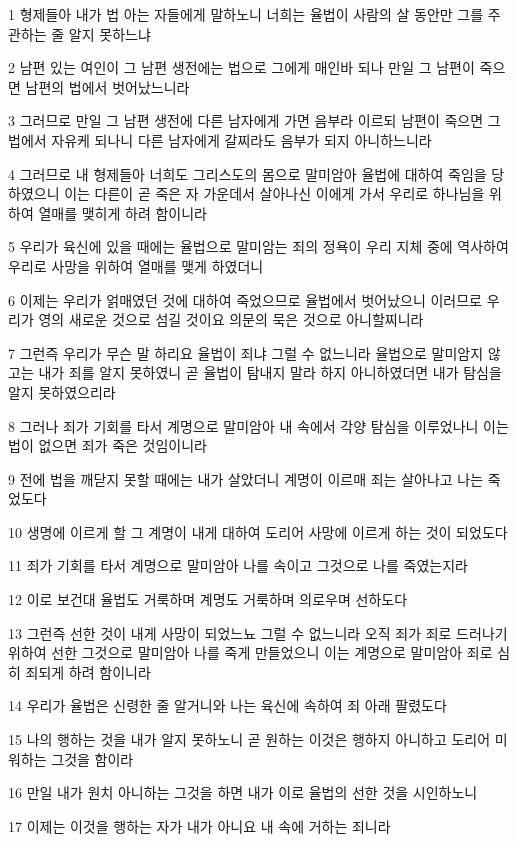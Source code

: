 \par 1 형제들아 내가 법 아는 자들에게 말하노니 너희는 율법이 사람의 살 동안만 그를 주관하는 줄 알지 못하느냐
\par 2 남편 있는 여인이 그 남편 생전에는 법으로 그에게 매인바 되나 만일 그 남편이 죽으면 남편의 법에서 벗어났느니라
\par 3 그러므로 만일 그 남편 생전에 다른 남자에게 가면 음부라 이르되 남편이 죽으면 그 법에서 자유케 되나니 다른 남자에게 갈찌라도 음부가 되지 아니하느니라
\par 4 그러므로 내 형제들아 너희도 그리스도의 몸으로 말미암아 율법에 대하여 죽임을 당하였으니 이는 다른이 곧 죽은 자 가운데서 살아나신 이에게 가서 우리로 하나님을 위하여 열매를 맺히게 하려 함이니라
\par 5 우리가 육신에 있을 때에는 율법으로 말미암는 죄의 정욕이 우리 지체 중에 역사하여 우리로 사망을 위하여 열매를 맺게 하였더니
\par 6 이제는 우리가 얽매였던 것에 대하여 죽었으므로 율법에서 벗어났으니 이러므로 우리가 영의 새로운 것으로 섬길 것이요 의문의 묵은 것으로 아니할찌니라
\par 7 그런즉 우리가 무슨 말 하리요 율법이 죄냐 그럴 수 없느니라 율법으로 말미암지 않고는 내가 죄를 알지 못하였니 곧 율법이 탐내지 말라 하지 아니하였더면 내가 탐심을 알지 못하였으리라
\par 8 그러나 죄가 기회를 타서 계명으로 말미암아 내 속에서 각양 탐심을 이루었나니 이는 법이 없으면 죄가 죽은 것임이니라
\par 9 전에 법을 깨닫지 못할 때에는 내가 살았더니 계명이 이르매 죄는 살아나고 나는 죽었도다
\par 10 생명에 이르게 할 그 계명이 내게 대하여 도리어 사망에 이르게 하는 것이 되었도다
\par 11 죄가 기회를 타서 계명으로 말미암아 나를 속이고 그것으로 나를 죽였는지라
\par 12 이로 보건대 율법도 거룩하며 계명도 거룩하며 의로우며 선하도다
\par 13 그런즉 선한 것이 내게 사망이 되었느뇨 그럴 수 없느니라 오직 죄가 죄로 드러나기 위하여 선한 그것으로 말미암아 나를 죽게 만들었으니 이는 계명으로 말미암아 죄로 심히 죄되게 하려 함이니라
\par 14 우리가 율법은 신령한 줄 알거니와 나는 육신에 속하여 죄 아래 팔렸도다
\par 15 나의 행하는 것을 내가 알지 못하노니 곧 원하는 이것은 행하지 아니하고 도리어 미워하는 그것을 함이라
\par 16 만일 내가 원치 아니하는 그것을 하면 내가 이로 율법의 선한 것을 시인하노니
\par 17 이제는 이것을 행하는 자가 내가 아니요 내 속에 거하는 죄니라
